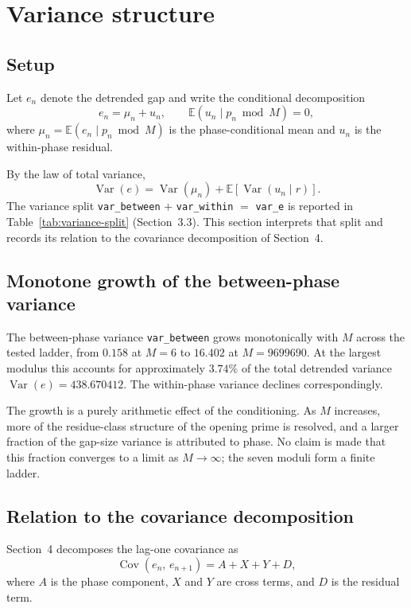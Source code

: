 \section{Variance structure}

\subsection{Setup}

Let $e_n$ denote the detrended gap and write the conditional decomposition
\[
e_n = \mu_n + u_n,\qquad \mathbb{E}(u_n \mid p_n \bmod M) = 0,
\]
where $\mu_n = \mathbb{E}(e_n \mid p_n \bmod M)$ is the phase-conditional mean and $u_n$ is the within-phase residual.

By the law of total variance,
\[
\operatorname{Var}(e) = \operatorname{Var}(\mu_n) + \mathbb{E}\!\left[\operatorname{Var}(u_n \mid r)\right].
\]
The variance split \texttt{var\_between} $+$ \texttt{var\_within} $=$ \texttt{var\_e} is reported in Table~\ref{tab:variance-split} (Section~3.3). This section interprets that split and records its relation to the covariance decomposition of Section~4.

\subsection{Monotone growth of the between-phase variance}

The between-phase variance \texttt{var\_between} grows monotonically with $M$ across the tested ladder, from $0.158$ at $M=6$ to $16.402$ at $M=9699690$. At the largest modulus this accounts for approximately $3.74\%$ of the total detrended variance $\operatorname{Var}(e) = 438.670412$. The within-phase variance declines correspondingly.

The growth is a purely arithmetic effect of the conditioning. As $M$ increases, more of the residue-class structure of the opening prime is resolved, and a larger fraction of the gap-size variance is attributed to phase. No claim is made that this fraction converges to a limit as $M\to\infty$; the seven moduli form a finite ladder.

\subsection{Relation to the covariance decomposition}

Section~4 decomposes the lag-one covariance as
\[
\operatorname{Cov}(e_n,\,e_{n+1}) = A + X + Y + D,
\]
where $A$ is the phase component, $X$ and $Y$ are cross terms, and $D$ is the residual term.

